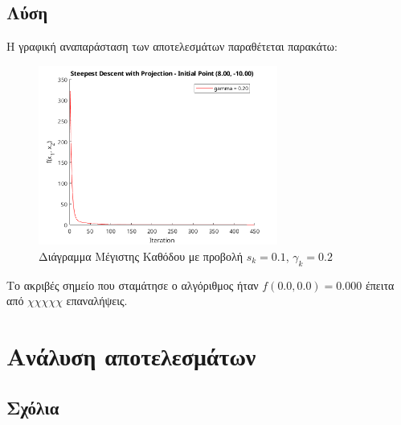 \documentclass{report}
\begin{document}
\section{Λύση}

Η γραφική αναπαράσταση των αποτελεσμάτων παραθέτεται παρακάτω:
\begin{figure}[H]
    \centering
    \includegraphics[width=0.7\textwidth]{media/thema4.png}
    \caption{Διάγραμμα Μέγιστης Καθόδου με προβολή $s_k = 0.1$, $\gamma_k = 0.2$} 
\end{figure}
Το ακριβές σημείο που σταμάτησε ο αλγόριθμος ήταν $f(0.0, 0.0) = 0.000$ έπειτα από
$χχχχχ$ επαναλήψεις.

\chapter{Ανάλυση αποτελεσμάτων}

\section{Σχόλια}


\nocite{*} %


\end{document}
